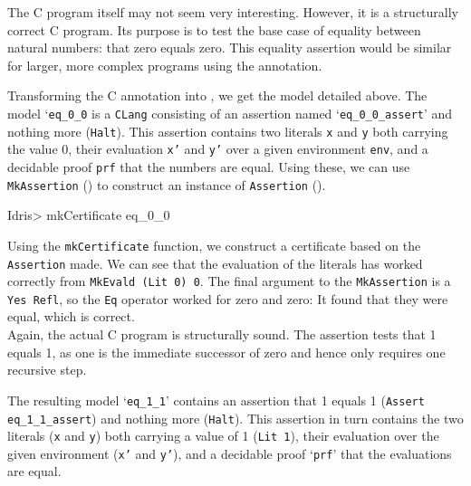         The C program itself may not seem very interesting. However, it is a structurally correct C program. Its purpose is to test the base case of equality between natural numbers: that zero equals zero. This equality assertion would be similar for larger, more complex programs using the annotation.
        
        
        Transforming the C annotation into \Idris, we get the model detailed above. The model `\texttt{eq\_0\_0} is a \texttt{CLang} consisting of an assertion named `\texttt{eq\_0\_0\_assert}' and nothing more (\texttt{Halt}). This assertion contains two literals \texttt{x} and \texttt{y} both carrying the value 0, their evaluation \texttt{x'} and \texttt{y'} over a given environment \texttt{env}, and a decidable proof \texttt{prf} that the numbers are equal. Using these, we can use \texttt{MkAssertion} () to construct an instance of \texttt{Assertion} ().
        
        \newpage
        
        \begin{code}
Idris> mkCertificate eq_0_0
        \end{code}
        
        Using the \texttt{mkCertificate} function, we construct a certificate based on the \texttt{Assertion} made. We can see that the evaluation of the literals has worked correctly from \texttt{MkEvald (Lit 0) 0}. The final argument to the \texttt{MkAssertion} is a \texttt{Yes Refl}, so the \texttt{Eq} operator worked for zero and zero: It found that they were equal, which is correct.
        \\
        
        
        
        Again, the actual C program is structurally sound. The assertion tests that 1 equals 1, as one is the immediate successor of zero and hence only requires one recursive step.
        
        
        The resulting \Idris model `\texttt{eq\_1\_1}' contains an assertion that 1 equals 1 (\texttt{Assert eq\_1\_1\_assert}) and nothing more (\texttt{Halt}). This assertion in turn contains the two literals (\texttt{x} and \texttt{y}) both carrying a value of 1 (\texttt{Lit 1}), their evaluation over the given environment (\texttt{x'} and \texttt{y'}), and a decidable proof `\texttt{prf}' that the evaluations are equal.
        
